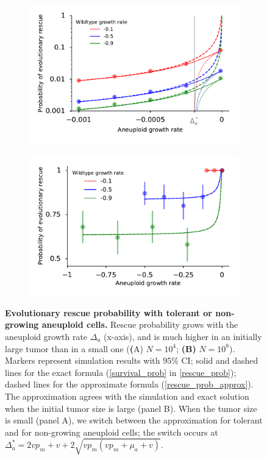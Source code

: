 \documentclass[12pt]{extarticle}
\begin{document}
\begin{figure}[p]
\begin{subfigure}{0.5\textwidth}
\includegraphics[width=1\textwidth]{Figures/P_est_divergence.pdf}
\end{subfigure}
\begin{subfigure}{0.5\textwidth}
\includegraphics[width=1\textwidth]{Figures/P_est_divergenceLargePopulation.pdf}
\end{subfigure}
\caption{\textbf{Evolutionary rescue probability with tolerant or non-growing aneuploid cells.}
Rescue probability grows with the aneuploid growth rate $\Delta_a$ (x-axis), and is much higher in an initially large tumor than in a small one (\textbf(A) $N=10^4$; \textbf{(B)} $N=10^8$). 
Markers represent simulation results with 95\% CI; solid and dashed lines for the exact formula (\cref{survival_prob} in \cref{rescue_prob}); %
dashed lines for the approximate formula (\cref{rescue_prob_approx}).
The approximation agrees with the simulation and exact solution when the initial tumor size is large (panel B).
When the tumor size is small (panel A), we switch between the approximation for tolerant and for non-growing aneuploid cells; the switch occurs at $\Delta_a^*=2vp_m+v+2\sqrt{vp_m\left(vp_m+\mu_a+v\right)}$.
}
\label{rescue_prob_an_growth}
\end{figure}
\end{document}
